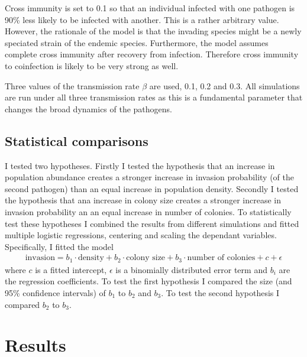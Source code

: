 Cross immunity is set to 0.1 so that an individual infected with one pathogen is 90\% less likely to be infected with another.
This is a rather arbitrary value.
However, the rationale of the model is that the invading species might be a newly speciated strain of the endemic species.
Furthermore, the model assumes complete cross immunity after recovery from infection.
Therefore cross immunity to coinfection is likely to be very strong as well.

Three values of the transmission rate $\beta$ are used, 0.1, 0.2 and 0.3.
All simulations are run under all three transmission rates as this is a fundamental parameter that changes the broad dynamics of the pathogens.


\subsection{Statistical comparisons}

I tested two hypotheses.
Firstly I tested the hypothesis that an increase in population abundance creates a stronger increase in invasion probability (of the second pathogen) than an equal increase in population density.
Secondly I tested the hypothesis that ana increase in colony size creates a stronger increase in invasion probability an an equal increase in number of colonies.
To statistically test these hypotheses I combined the results from different simulations and fitted multiple logistic regressions, centering and scaling the dependant variables.
Specifically, I fitted the model 
\begin{align}
\text{invasion} = b_1\cdot \text{density} + b_2\cdot  \text{colony size} + b_3\cdot  \text{number of colonies} + c + \epsilon
\end{align}
 where $c$ is a fitted intercept, $\epsilon$ is a binomially distributed error term and $b_i$ are the regression coefficients.
To test the first hypothesis I compared the size (and 95\% confidence intervals) of $b_1$ to $b_2$ and $b_3$.
To test the second hypothesis I compared $b_2$ to $b_3$.










\section{Results}

